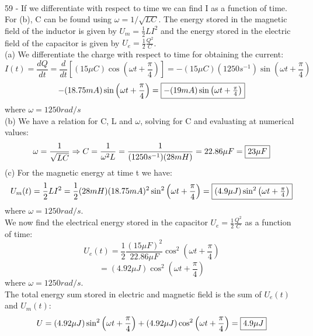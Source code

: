 \documentclass{report}
\begin{document}
\paragraph{}
59 - If we differentiate with respect to time we can find I as a function of time. For (b), C can be found using $\omega = 1 / \sqrt{LC}$. The energy stored in the magnetic field of the inductor is given by $U_m = \frac{1}{2}LI^2$ and the energy stored in the electric field of the capacitor is given by $U_e = \frac{1}{2}\frac{Q^2}{C}$.\\
(a) We differentiate the charge with respect to time for obtaining the current:
$$I(t) = \frac{dQ}{dt} = \frac{d}{dt}\left[ (15 \mu C) \cos \left( \omega t + \frac{\pi}{4} \right) \right] = -(15 \mu C)(1250s^{-1}) \sin \left( \omega t + \frac{\pi}{4} \right)$$
$$-(18.75mA) \sin \left( \omega t + \frac{\pi}{4} \right) = \fbox{$-(19mA) \sin \left( \omega t + \frac{\pi}{4} \right)$}$$
where $\omega = 1250 rad / s$\\
(b) We have a relation for C, L and $\omega$, solving for C and evaluating at numerical values:
$$\omega = \frac{1}{\sqrt{LC}} \Rightarrow C = \frac{1}{\omega^2 L} = \frac{1}{(1250s^{-1})(28mH)} = 22.86 \mu F = \fbox{$23 \mu F$}$$
(c) For the magnetic energy at time t we have:
$$U_m(t) = \frac{1}{2}LI^2 = \frac{1}{2}(28mH)(18.75mA)^2 \sin^2 \left( \omega t + \frac{\pi}{4} \right) = \fbox{$(4.9 \mu J) \sin^2 \left( \omega t + \frac{\pi}{4} \right)$}$$
where $\omega = 1250 rad / s$.\\
We now find the electrical energy stored in the capacitor $U_e = \frac{1}{2} \frac{Q^2}{C}$ as a function of time:
$$U_e(t) = \frac{1}{2} \frac{(15 \mu F)^2}{22.86 \mu F} \cos^2 \left( \omega t + \frac{\pi}{4} \right)$$
$$= (4.92 \mu J) \cos^2 \left( \omega t + \frac{\pi}{4} \right)$$
where $\omega = 1250 rad / s$.\\
The total energy sum stored in electric and magnetic field is the sum of $U_e(t)$ and $U_m(t)$:
$$U = (4.92 \mu J) \sin^2 \left( \omega t + \frac{\pi}{4} \right) + (4.92 \mu J) \cos^2 \left( \omega t + \frac{\pi}{4} \right) = \fbox{$4.9 \mu J$}$$
\end{document}
